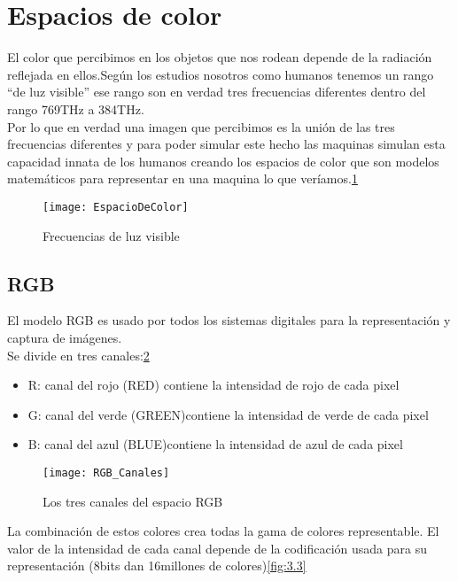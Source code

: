 
\section{Espacios de color }
El color que percibimos en los objetos que nos rodean depende de la radiación reflejada en ellos.Según los estudios nosotros como humanos tenemos un rango ``de luz visible'' ese rango son en verdad tres frecuencias diferentes dentro del rango 769THz a 384THz.\\
Por lo que en verdad una imagen que percibimos es la unión de las tres frecuencias diferentes y para poder simular este hecho las maquinas simulan esta capacidad innata de los humanos creando los espacios de color que son modelos matemáticos para representar en una maquina lo que veríamos.\ref{fig:3.1}

\begin{figure}[h]
\centering
\texttt{[image: EspacioDeColor]}
\caption{Frecuencias de luz visible \cite{Manual:HAE}}
\label{fig:3.1}
\end{figure}

\subsection{RGB}
El modelo RGB es usado por todos los sistemas digitales para la representación y captura de imágenes.\\
Se divide en tres canales:\ref{fig:3.2}\\
\begin{itemize}
	\item R: canal del rojo (RED) contiene la intensidad de rojo de cada pixel\\
	\item G: canal del verde (GREEN)contiene la intensidad de verde de cada pixel\\
	\item B: canal del azul (BLUE)contiene la intensidad de azul de cada pixel\\
\end{itemize}

\begin{figure}[h]
\centering
\texttt{[image: RGB\_Canales]}
\caption{Los tres canales del espacio RGB \cite{Manual:HAE}}
\label{fig:3.2}
\end{figure}
La combinación de estos colores crea todas la gama de colores representable.
El valor de la intensidad de cada canal depende de la codificación usada para su representación (8bits dan 16millones de colores)\ref{fig:3.3}


